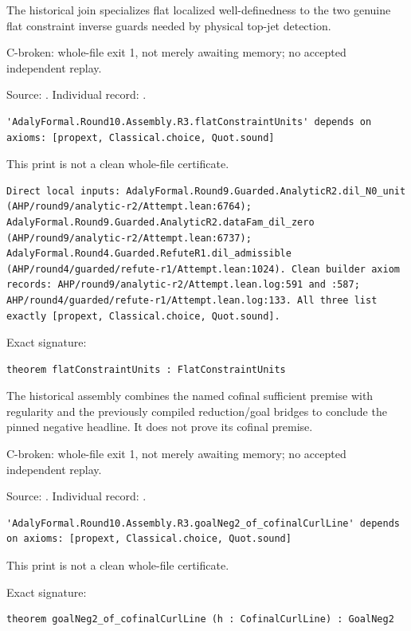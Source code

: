 \begin{theorem}
\label{join-5}
\uses{}
The historical join specializes flat localized well-definedness to the two genuine flat constraint inverse guards needed by physical top-jet detection.
\par C-broken: whole-file exit 1, not merely awaiting memory; no accepted independent replay.
\par Source: \texttt{}. Individual record: \texttt{}.
\begin{verbatim}
'AdalyFormal.Round10.Assembly.R3.flatConstraintUnits' depends on axioms: [propext, Classical.choice, Quot.sound]
\end{verbatim}
This print is not a clean whole-file certificate.
\begin{verbatim}
Direct local inputs: AdalyFormal.Round9.Guarded.AnalyticR2.dil_N0_unit (AHP/round9/analytic-r2/Attempt.lean:6764); AdalyFormal.Round9.Guarded.AnalyticR2.dataFam_dil_zero (AHP/round9/analytic-r2/Attempt.lean:6737); AdalyFormal.Round4.Guarded.RefuteR1.dil_admissible (AHP/round4/guarded/refute-r1/Attempt.lean:1024). Clean builder axiom records: AHP/round9/analytic-r2/Attempt.lean.log:591 and :587; AHP/round4/guarded/refute-r1/Attempt.lean.log:133. All three list exactly [propext, Classical.choice, Quot.sound].
\end{verbatim}
\par Exact signature:
\begin{verbatim}
theorem flatConstraintUnits : FlatConstraintUnits
\end{verbatim}
\end{theorem}

\begin{theorem}
\label{join-6}
The historical assembly combines the named cofinal sufficient premise with regularity and the previously compiled reduction/goal bridges to conclude the pinned negative headline. It does not prove its cofinal premise.
\par C-broken: whole-file exit 1, not merely awaiting memory; no accepted independent replay.
\par Source: \texttt{}. Individual record: \texttt{}.
\begin{verbatim}
'AdalyFormal.Round10.Assembly.R3.goalNeg2_of_cofinalCurlLine' depends on axioms: [propext, Classical.choice, Quot.sound]
\end{verbatim}
This print is not a clean whole-file certificate.
\par Exact signature:
\begin{verbatim}
theorem goalNeg2_of_cofinalCurlLine (h : CofinalCurlLine) : GoalNeg2
\end{verbatim}
\end{theorem}

